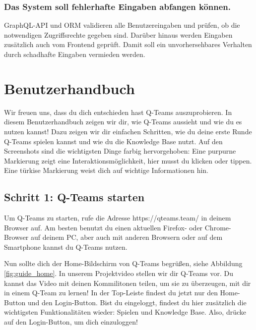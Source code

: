 \documentclass[a4paper,11pt,listof=numbered,glossary=totoc,parskip=half,toc=bib]{scrreprt}
\begin{document}
\begin{appendices}
	\subsection{Das System soll fehlerhafte Eingaben abfangen können.}
	GraphQL-API und ORM validieren alle Benutzereingaben und prüfen, ob die notwendigen Zugriffsrechte gegeben sind. Darüber hinaus werden Eingaben zusätzlich auch vom Frontend geprüft. Damit soll ein unvorhersehbares Verhalten durch schadhafte Eingaben vermieden werden.
	
	\chapter{Benutzerhandbuch}

	Wir freuen uns, dass du dich entschieden hast Q-Teams auszuprobieren. In diesem Benutzerhandbuch zeigen wir dir, wie Q-Teams aussieht und wie du es nutzen kannst! Dazu zeigen wir dir einfachen Schritten, wie du deine erste Runde Q-Teams spielen kannst und wie du die Knowledge Base nutzt. Auf den Screenshots sind die wichtigsten Dinge farbig hervorgehoben: Eine purpurne Markierung zeigt eine Interaktionsmöglichkeit, hier musst du klicken oder tippen. Eine türkise Markierung weist dich auf wichtige Informationen hin.
	\newpage
	\section*{Schritt 1: Q-Teams starten}
	
	Um Q-Teams zu starten, rufe die Adresse https://qteams.team/ in deinem Browser auf. Am besten benutzt du einen aktuellen Firefox- oder Chrome-Browser auf deinem PC, aber auch mit anderen Browsern oder auf dem Smartphone kannst du Q-Teams nutzen.
	
	Nun sollte dich der Home-Bildschirm von Q-Teams begrüßen, siehe Abbildung \ref{fig:guide_home}. In unserem Projektvideo stellen wir dir Q-Teams vor. Du kannst das Video mit deinen Kommilitonen teilen, um sie zu überzeugen, mit dir in einem Q-Team zu lernen! In der Top-Leiste findest du jetzt nur den Home-Button und den Login-Button. Bist du eingeloggt, findest du hier zusätzlich die wichtigsten Funktionalitäten wieder: Spielen und Knowledge Base. Also, drücke auf den Login-Button, um dich einzuloggen!
	

\end{appendices}
\end{document}

